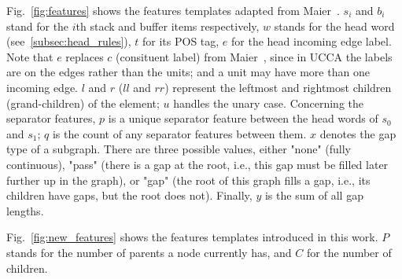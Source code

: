 \documentclass[11pt]{article}
\begin{document}
Fig.~\ref{fig:features} shows the features templates adapted from Maier~. $s_i$ and $b_i$ stand for the $i$th stack and buffer items respectively, $w$ stands for the head word (see~\ref{subsec:head_rules}), $t$ for its POS tag, $e$ for the head incoming edge label. Note that $e$ replaces $c$ (consituent label) from Maier~, since in UCCA the labels are on the edges rather than the units; and a unit may have more than one incoming edge. $l$ and $r$ ($ll$ and $rr$) represent the leftmost and rightmost children (grand-children) of the element; $u$ handles the unary case.
Concerning the separator features, $p$ is a unique separator feature between the head words of $s_0$ and $s_1$; $q$ is the count of any separator features between them.
$x$ denotes the gap type of a subgraph. There are three possible values, either "none" (fully continuous), "pass" (there is a gap at the root, i.e., this gap must be filled later further up in the graph), or "gap" (the root of this graph fills a gap, i.e., its children have gaps, but the root does not). Finally, $y$ is the sum of all gap lengths.

Fig.~\ref{fig:new_features} shows the features templates introduced in this work. $P$ stands for the number of parents a node currently has, and $C$ for the number of children.
\end{document}
